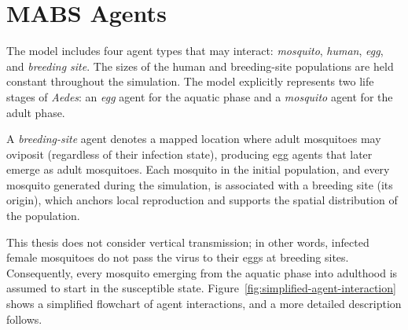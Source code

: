 \section{MABS Agents} \label{sec:agents}

The model includes four agent types that may interact: \emph{mosquito}, \emph{human}, \emph{egg}, and \emph{breeding site}. The sizes of the human and breeding-site populations are held constant throughout the simulation. The model explicitly represents two life stages of \emph{Aedes}: an \emph{egg} agent for the aquatic phase and a \emph{mosquito} agent for the adult phase.

A \emph{breeding-site} agent denotes a mapped location where adult mosquitoes may oviposit (regardless of their infection state), producing egg agents that later emerge as adult mosquitoes. Each mosquito in the initial population, and every mosquito generated during the simulation, is associated with a breeding site (its origin), which anchors local reproduction and supports the spatial distribution of the population.

This thesis does not consider vertical transmission; in other words, infected female mosquitoes do not pass the virus to their eggs at breeding sites. Consequently, every mosquito emerging from the aquatic phase into adulthood is assumed to start in the susceptible state. Figure~\ref{fig:simplified-agent-interaction} shows a simplified flowchart of agent interactions, and a more detailed description follows.

